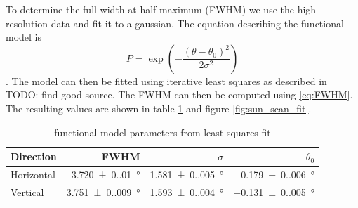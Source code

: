 To determine the full width at half maximum (FWHM) we use the high resolution data and fit it to a gaussian.
The equation describing the functional model is
\begin{equation}
    P = \exp{\left(-\frac{(\theta-\theta_0)^2}{2\sigma^2}\right)}
\end{equation}.
The model can then be fitted using iterative least squares as described in TODO: find good source. The FWHM can then be computed using \eqref{eq:FWHM}. 
The resulting values are shown in table \ref{tab:params} and figure \ref{fig:sun_scan_fit}.
\begin{table}[ht]
    \centering
    \begin{tabular}{lrrr}
        \toprule
        Direction & FWHM & $ \sigma $ & $ \theta_0 $\\
        \midrule
        Horizontal & \SI{3.720(0.010)}{\degree} & \SI{1.581(0.005)}{\degree} & \SI{0.179(0.006)}{\degree} \\
        Vertical & \SI{3.751(0.009)}{\degree} & \SI{1.593(0.004)}{\degree} & \SI{-0.131(0.005)}{\degree} \\
        \bottomrule
    \end{tabular}
    \caption{functional model parameters from least squares fit}
    \label{tab:params}
\end{table}
